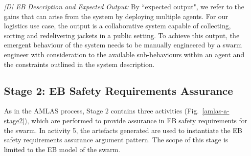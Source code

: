 \documentclass[runningheads]{llncs}
\begin{document}
\emph{[D] EB Description and Expected Output:}
By ``expected output", we refer to the gains that can arise from the system by deploying multiple agents. For our logistics use case, the output is a collaborative system capable of collecting, sorting and redelivering jackets in a public setting. 
To achieve this output, the emergent behaviour of the system needs to be manually engineered by a swarm engineer with consideration to the available sub-behaviours within an agent and the constraints outlined in the system description.

%



\subsection{Stage 2: EB Safety Requirements Assurance} \label{framework-stage2}
As in the AMLAS process, Stage 2 contains three activities (Fig.~\ref{amlas-a-stage2}), which are performed to provide assurance in EB safety requirements for the swarm. 
In activity 5, the artefacts generated are used to instantiate the EB safety requirements assurance argument pattern. The scope of this stage is limited to the EB model of the swarm.
\end{document}
